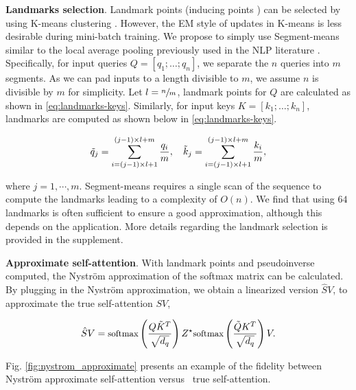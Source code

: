 \smallskip
\textbf{Landmarks selection}. Landmark points (inducing points \cite{lee2019set}) can be selected by using K-means clustering \cite{zhang2008improved,vyas2020fast}. However, the EM style of updates in K-means is less desirable during mini-batch training. We propose to simply use Segment-means similar to the local average pooling previously used in the NLP literature \cite{shen2018baseline}. Specifically, for input queries $Q = [q_1; \dots; q_n]$, we separate the $n$ queries into $m$ segments. As we can pad inputs to a length divisible to $m$, we assume $n$ is divisible by $m$ for simplicity. Let $l = \sfrac{n}{m}$, landmark points for $Q$ are calculated as shown in \eqref{eq:landmarks-keys}.
Similarly, for input keys $K=[k_1; \dots; k_n]$, landmarks are computed as shown below in \eqref{eq:landmarks-keys}.

\begin{align}\label{eq:landmarks-keys}
\small
\Tilde{q}_j = \sum_{i = (j - 1)\times l + 1}^{(j - 1) \times l + m} \frac{q_i}{m}, \quad
\Tilde{k}_j = \sum_{i = (j - 1)\times l + 1}^{(j - 1) \times l + m}\frac{k_i}{m}, 
\end{align}

where $j=1, \cdots, m$. Segment-means requires a single scan of the sequence to compute the landmarks leading to a complexity of $O(n)$. We find that using $64$ landmarks is often sufficient to ensure a good approximation, although this depends on the application. More details regarding the landmark selection is provided in the supplement. 

\textbf{Approximate self-attention}.  With landmark points and pseudoinverse computed, the Nystr\"{o}m approximation of the softmax matrix can be calculated. By plugging in the Nystr\"{o}m approximation, we obtain a linearized version $\hat{S}V$, to approximate the true self-attention $SV$,

\begin{equation}\label{eq:approxatten}
\small
    \hat{S}V = \text{softmax}\left(\frac{Q\Tilde{K}^T}{\sqrt{d_q}}\right) Z^{\star}\text{softmax}\left(\frac{\Tilde{Q}K^T}{\sqrt{d_q}}\right) V.
\end{equation}

Fig. \ref{fig:nystrom_approximate} presents an example of the fidelity between Nystr\"{o}m approximate self-attention versus \ true self-attention.


